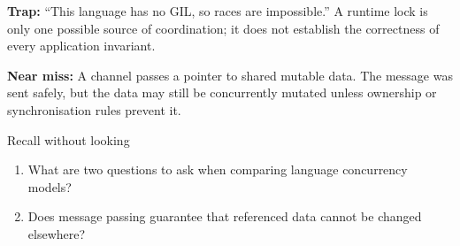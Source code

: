 \documentclass[11pt]{article}
\begin{document}
\begin{keepsection}
\begin{notebox}\textbf{Trap:} “This language has no GIL, so races are impossible.” A runtime lock is only one possible source of coordination; it does not establish the correctness of every application invariant.\end{notebox}

\begin{notebox}\textbf{Near miss:} A channel passes a pointer to shared mutable data. The message was sent safely, but the data may still be concurrently mutated unless ownership or synchronisation rules prevent it.\end{notebox}

\begin{recallbox}{Recall without looking}
\begin{enumerate}
\item What are two questions to ask when comparing language concurrency models?
\item Does message passing guarantee that referenced data cannot be changed elsewhere?
\end{enumerate}

\end{recallbox}
\end{keepsection}
\end{document}
